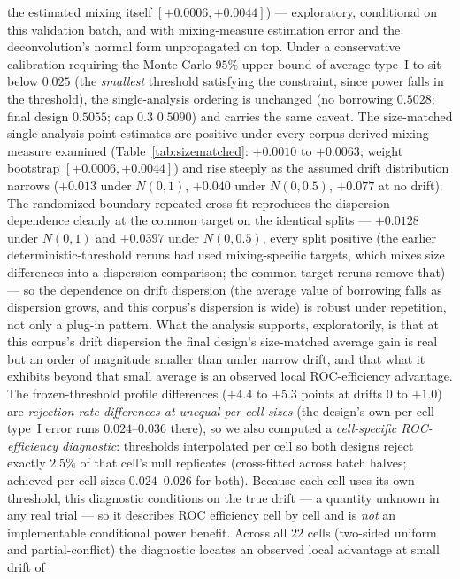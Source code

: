 \documentclass[11pt]{article}
\begin{document}
the estimated mixing itself $[+0.0006, +0.0044]$) --- exploratory,
conditional on this validation batch, and with mixing-measure
estimation error and the deconvolution's
normal form unpropagated on top. Under a conservative
calibration requiring the Monte Carlo $95\%$ upper bound of average
type~I to sit below $0.025$ (the \emph{smallest} threshold satisfying the
constraint, since power falls in the threshold), the single-analysis
ordering is unchanged (no borrowing
$0.5028$; final design $0.5055$; cap $0.3$ $0.5090$) and carries the same
caveat. The size-matched
single-analysis point estimates are positive under every corpus-derived
mixing measure examined
(Table~\ref{tab:sizematched}: $+0.0010$ to $+0.0063$; weight bootstrap
$[+0.0006, +0.0044]$) and rise steeply as the assumed
drift distribution narrows ($+0.013$ under $N(0,1)$, $+0.040$ under
$N(0,0.5)$, $+0.077$ at no drift). The randomized-boundary repeated
cross-fit reproduces the dispersion dependence cleanly at the common
target on the identical splits --- $+0.0128$ under $N(0,1)$ and
$+0.0397$ under $N(0,0.5)$, every split positive (the earlier
deterministic-threshold reruns had used mixing-specific targets, which
mixes size differences into a dispersion comparison; the common-target
reruns remove that) --- so the dependence on drift dispersion (the
average value of borrowing falls as dispersion grows, and this corpus's
dispersion is wide) is robust under repetition, not only a plug-in
pattern. What
the analysis supports,
exploratorily, is that at this corpus's drift dispersion the final
design's size-matched average gain is real but an order of magnitude
smaller than under narrow drift, and that what it exhibits beyond that
small average is an observed local ROC-efficiency advantage. The frozen-threshold profile differences
($+4.4$ to $+5.3$ points at drifts $0$ to $+1.0$) are \emph{rejection-rate
differences at unequal per-cell sizes} (the design's own per-cell type~I
error runs $0.024$--$0.036$ there), so we also computed a
\emph{cell-specific ROC-efficiency diagnostic}: thresholds interpolated
per cell so both designs reject exactly
$2.5\%$ of that cell's null replicates (cross-fitted across batch halves;
achieved per-cell sizes $0.024$--$0.026$ for both). Because each cell
uses its own threshold, this diagnostic conditions on the true drift ---
a quantity unknown in any real trial --- so it describes ROC efficiency
cell by cell and is \emph{not} an implementable conditional power
benefit. Across all $22$ cells (two-sided uniform and partial-conflict)
the diagnostic locates an observed local advantage at small drift of
\end{document}
